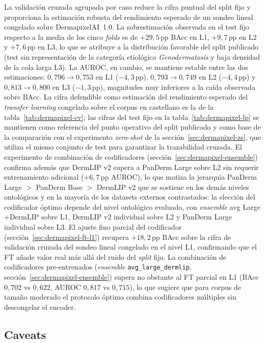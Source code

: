 La validación cruzada agrupada por caso reduce la cifra puntual
del split fijo y proporciona la estimación robusta del rendimiento
esperado de un sondeo lineal congelado sobre DermapixelAI~1.0. La
sobrestimación observada en el test fijo respecto a la media de
los cinco \emph{folds} es de $+29{,}5$\,pp BAcc en L1,
$+9{,}7$\,pp en L2 y $+7{,}6$\,pp en L3, lo que se atribuye a la
distribución favorable del split publicado (test sin representación
de la categoría etiológica \emph{Genodermatosis} y baja densidad de
la cola larga L3). La AUROC, en cambio, se mantiene estable entre
las dos estimaciones: $0{,}796 \to 0{,}753$ en L1
($-4{,}3$\,pp), $0{,}793 \to 0{,}749$ en L2
($-4{,}4$\,pp) y $0{,}813 \to 0{,}800$ en L3
($-1{,}3$\,pp), magnitudes muy inferiores a la caída observada
sobre BAcc. La cifra defendible como estimación del rendimiento
esperado del \emph{transfer learning} congelado sobre el corpus en
castellano es la de la tabla~\ref{tab:dermapixel-cv}; las cifras
del test fijo en la tabla~\ref{tab:dermapixel-lp} se mantienen
como referencia del punto operativo del split publicado y como
base de la comparación con el experimento \emph{zero-shot} de la
secci\'on~\ref{sec:dermapixel-zs}, que utiliza el mismo conjunto
de test para garantizar la trazabilidad cruzada. El experimento
de combinación de codificadores
(secci\'on~\ref{sec:dermapixel-ensemble}) confirma además que
DermLIP v2 supera a PanDerm Large sobre L2 sin requerir
entrenamiento adicional ($+6{,}7$\,pp AUROC), lo que matiza la
jerarquía PanDerm Large $>$ PanDerm Base $>$ DermLIP v2 que se
sostiene en los demás niveles ontológicos y en la mayoría de los
datasets externos contrastados: la elección del codificador
óptimo depende del nivel ontológico evaluado, con
\emph{ensemble} avg Large$+$DermLIP sobre L1, DermLIP v2
individual sobre L2 y PanDerm Large individual sobre L3. El
ajuste fino parcial del codificador
(secci\'on~\ref{sec:dermapixel-ft-l1}) recupera
$+18{,}2$\,pp BAcc sobre la cifra de validación cruzada del
sondeo lineal congelado en el nivel L1, confirmando que el FT
añade valor real más allá del ruido del \emph{split} fijo. La
combinación de codificadores pre-entrenados (\emph{ensemble}
\texttt{avg\_large\_dermlip}, secci\'on~\ref{sec:dermapixel-ensemble})
supera no obstante al FT parcial en L1 (BAcc $0{,}702$ vs
$0{,}622$, AUROC $0{,}817$ vs $0{,}715$), lo que sugiere que
para corpus de tamaño moderado el protocolo óptimo combina
codificadores múltiples sin descongelar el encoder.

\subsection*{Caveats}

